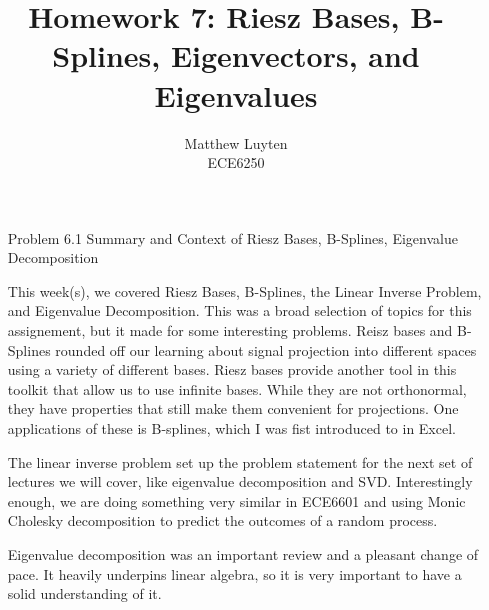 \documentclass[12pt]{article}
\begin{document}
 
\title{Homework 7: Riesz Bases, B-Splines, Eigenvectors, and Eigenvalues}
\author{Matthew Luyten\\
ECE6250}

\maketitle

\begin{enumerate}
\item[Problem 6.1] Summary and Context of Riesz Bases, B-Splines, Eigenvalue Decomposition

This week(s), we covered Riesz Bases, B-Splines, the Linear Inverse Problem, and Eigenvalue Decomposition. This was
a broad selection of topics for this assignement, but it made for some interesting problems. Reisz bases and B-Splines
rounded off our learning about signal projection into different spaces using a variety of different bases. Riesz bases
provide another tool in this toolkit that allow us to use infinite bases. While they are not orthonormal, they have
properties that still make them convenient for projections. One applications of these is B-splines, which I was fist
introduced to in Excel.

The linear inverse problem set up the problem statement for the next set of lectures we will cover, like eigenvalue
decomposition and SVD. Interestingly enough, we are doing something very similar in ECE6601 and using Monic Cholesky
decomposition to predict the outcomes of a random process.

Eigenvalue decomposition was an important review and a pleasant change of pace. It heavily underpins linear algebra,
so it is very important to have a solid understanding of it.

\newpage


\end{enumerate}
\end{document}

